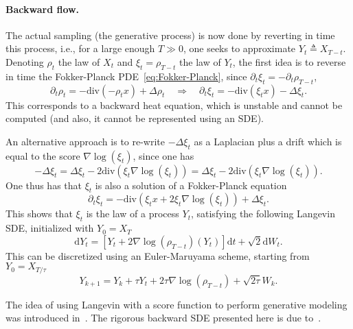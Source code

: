 \paragraph{Backward flow.}
The actual sampling (the generative process) is now done by reverting in time this process, i.e., for a large enough $T \gg 0$, one seeks to approximate $Y_t \triangleq X_{T-t}$. 
%
Denoting $\rho_t$ the law of $X_t$ and $\xi_t = \rho_{T-t}$ the law of $Y_t$, the first idea is to reverse in time the Fokker-Planck PDE~\eqref{eq:Fokker-Planck}, since $\partial_t \xi_t=-\partial_t \rho_{T-t}$,
\begin{equation*}
	\partial_t \rho_t = -\text{div}(- \rho_t x) + \Delta \rho_t
	\quad\Rightarrow\quad
	\partial_t \xi_t = -\text{div}( \xi_t x) - \Delta \xi_t.
\end{equation*}
This corresponds to a backward heat equation, which is unstable and cannot be computed (and also, it cannot be represented using an SDE).

An alternative approach is to re-write $- \Delta \xi_t$ as a Laplacian plus a drift which is equal to the score $\nabla \log(\xi_t)$, since one has
\begin{equation*}
	- \Delta \xi_t	 = \Delta \xi_t	- 2 \text{div}(\xi_t \nabla \log(\xi_t) ) 
		= \Delta \xi_t	- 2 \text{div}(\xi_t \nabla \log(\xi_t)).
\end{equation*}
One thus has that $\xi_t$ is also a solution of a Fokker-Planck equation
\begin{equation*}
	\partial_t \xi_t = -\text{div}( \xi_{t} x + 2 \xi_t \nabla \log(\xi_t) ) +  \Delta \xi_t.
\end{equation*}
This shows that $\xi_t$ is the law of a process $Y_t$, satisfying the following Langevin SDE, initialized with $Y_0=X_T$
\begin{equation*}
	\mathrm{d} Y_t = [ Y_t + 2 \nabla \log(\rho_{T-t})(Y_t) ] \mathrm{d} t + \sqrt{2} \mathrm{d} W_t. 
\end{equation*}
This can be discretized using an Euler-Maruyama scheme, starting from $Y_0=X_{T/\tau}$
\begin{equation}\label{eq:diffusion-discr-bwd}
	Y_{k+1} = Y_k + \tau Y_t + 2\tau \nabla \log(\rho_{T-t})  + \sqrt{2\tau} W_k. 
\end{equation}

The idea of using Langevin with a score function to perform generative modeling was introduced in~\cite{song2019generative}. The rigorous backward SDE presented here is due to~\cite{song2021scorebased}. 

